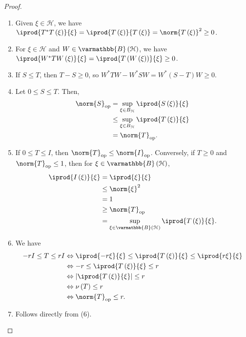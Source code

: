\documentclass[10pt]{mypackage}
\renewcommand*{\mathbb}[1]{\varmathbb{#1}}
\newcommand{\B}{\mathbb{B}}
\begin{document}
\begin{proof}\hfill
  \begin{enumerate}[(1)]
    \item Given $\xi\in \mathcal{H}$, we have $ \iprod{T^{\ast}T\left(\xi\right)}{\xi} = \iprod{T\left(\xi\right)}{T\left(\xi\right)} = \norm{T\left(\xi\right)}^2 \geq 0 $.
    \item For $\xi\in \mathcal{H}$ and $W\in \B\left(\mathcal{H}\right)$, we have $ \iprod{W^{\ast}TW\left(\xi\right)}{\xi} = \iprod{T\left(W\left(\xi\right)\right)}{\xi} \geq 0$.
    \item If $S\leq T$, then $T - S \geq 0$, so $W^{\ast}TW - W^{\ast}SW = W^{\ast}\left(S-T\right)W \geq 0$.
    \item Let $0 \leq S \leq T$. Then,
      \begin{align*}
        \norm{S}_{\text{op}} &= \sup_{\xi\in B_{\mathcal{H}}} \iprod{S\left(\xi\right)}{\xi}\\
                             &\leq \sup_{\xi\in B_{\mathcal{H}}} \iprod{T\left(\xi\right)}{\xi}\\
                             &= \norm{T}_{\text{op}}.
      \end{align*}
    \item If $0 \leq T \leq I$, then $\norm{T}_{\text{op}}\leq \norm{I}_{\text{op}}$. Conversely, if $T\geq 0$ and $\norm{T}_{\text{op}}\leq 1$, then for $\xi\in \B\left(\mathcal{H}\right)$,
      \begin{align*}
        \iprod{I\left(\xi\right)}{\xi} &= \iprod{\xi}{\xi}\\
                                       &\leq \norm{\xi}^2\\
                                       &= 1\\
                                       &\geq \norm{T}_{\text{op}}\\
                                       &= \sup_{\xi\in \B\left(\mathcal{H}\right)} \iprod{T\left(\xi\right)}{\xi}.
      \end{align*}
    \item We have
      \begin{align*}
        -rI \leq T \leq rI &\Leftrightarrow \iprod{-r\xi}{\xi} \leq \iprod{T\left(\xi\right)}{\xi} \leq \iprod{r\xi}{\xi}\\
                           &\Leftrightarrow -r \leq \iprod{T\left(\xi\right)}{\xi} \leq r\\
                           &\Leftrightarrow \left\vert \iprod{T\left(\xi\right)}{\xi} \right\vert \leq r\\
                           &\Leftrightarrow \nu\left(T\right)\leq r\\
                           &\Leftrightarrow \norm{T}_{\text{op}}\leq r.
      \end{align*}
    \item Follows directly from (6).
  \end{enumerate}
\end{proof}
\end{document}
